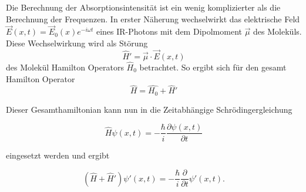 \documentclass[a4paper,12pt]{article}
\begin{document}
Die Berechnung der Absorptionsintensität ist ein wenig komplizierter als die Berechnung der Frequenzen. In erster Näherung wechselwirkt das 
elektrische Feld $\vec{E}(x,t)=\vec{E}_0(x)e^{-i\omega t}$ eines IR-Photons mit dem Dipolmoment $\vec{\mu}$ des Moleküls. Diese Wechselwirkung
wird als Störung 
\begin{equation}
\hat{H}'= \vec{\mu}\cdot \vec{E}(x,t)
\end{equation}
 des Molekül Hamilton Operators $\hat{H}_0$ betrachtet. So ergibt sich für den gesamt Hamilton Operator 
\begin{equation}
 \hat{H}=\hat{H_0}+\hat{H}'
\end{equation}

Dieser Gesamthamiltonian kann nun in die Zeitabhängige Schrödingergleichung 

\begin{equation}\label{schroedinger}
 \hat{H}\psi(x,t)=-\frac{\hbar}{i} \frac{\partial \psi(x,t)}{\partial t}
\end{equation}

eingesetzt werden und ergibt

\begin{equation}\label{schroedingerpert}
 (\hat{H}+\hat{H}')\psi'(x,t)=-\frac{\hbar}{i}\frac{\partial}{\partial t}\psi'(x,t).
\end{equation}
\end{document}
